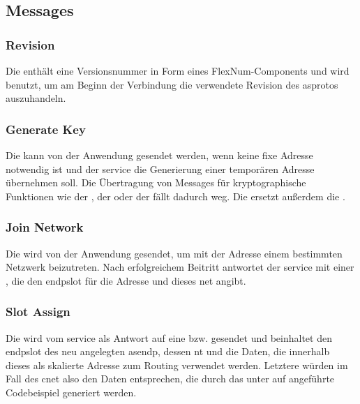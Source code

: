\asprotobytefield

\subsection{Messages}

\subsubsection{Revision}
\label{dcl-asproto-revision}
Die \msg{\asprotorevision} enthält eine Versionsnummer in Form eines
FlexNum-Components und wird benutzt, um am Beginn der Verbindung die verwendete
Revision des \gls{asproto}s auszuhandeln.

\asprotorevisionbytefield


\subsubsection{Generate Key}
\label{dcl-asproto-genkey}
Die \msg{\asprotogenkey} kann von der Anwendung gesendet werden, wenn keine fixe
Adresse notwendig ist und der \gls{service} die Generierung einer temporären
Adresse übernehmen soll. Die Übertragung von Messages für kryptographische
Funktionen wie der \msg{\asprotokeyenc}, der \msg{\asprotokeydec} oder der
\msg{\asprotocryptoresponse} fällt dadurch weg.
Die \msg{\asprotogenkey} ersetzt außerdem die \msg{\asprotoaddrpubkey}.

\asprotogenkeybytefield


\subsubsection{Join Network}
\label{dcl-asproto-joinnet}
Die \msg{\asprotojoinnet} wird von der Anwendung gesendet, um mit der Adresse
einem bestimmten Netzwerk beizutreten.
Nach erfolgreichem Beitritt antwortet der \gls{service} mit einer
\msg{\asprotoslotassign}, die den \gls{endpslot} für die Adresse und dieses
\gls{net} angibt.

\asprotojoinnetbytefield


\subsubsection{Slot Assign}
\label{dcl-asproto-slotassign}
Die \msg{\asprotoslotassign} wird vom \gls{service} als Antwort auf eine
\msg{\asprotojoinnet} bzw. \msg{\asprotojoindefnets} gesendet und beinhaltet
den \gls{endpslot} des neu angelegten \gls{asendp}, dessen \gls{nt} und die
Daten, die innerhalb dieses  als skalierte Adresse zum
Routing verwendet werden. Letztere würden im Fall des \gls{cnet} also den Daten
entsprechen, die durch das unter  auf
 angeführte Codebeispiel generiert werden.

